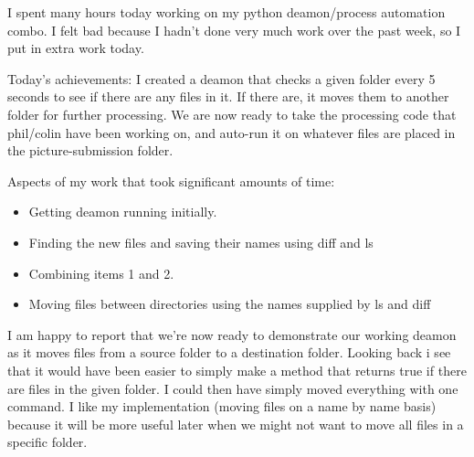 \documentclass[]{article}
\begin{document}
	I spent many hours today working on my python deamon/process automation combo. I felt bad because I hadn't done very much work over the past week, so I put in extra work today.
	
	Today's achievements: I created a deamon that checks a given folder every 5 seconds to see if there are any files in it. If there are, it moves them to another folder for further processing. We are now ready to take the processing code that phil/colin have been working on, and auto-run it on whatever files are placed in the picture-submission folder.
	
	Aspects of my work that took significant amounts of time:
	
	\begin{itemize}
					\item Getting deamon running initially.
					\item Finding the new files and saving their names using diff and ls
					\item Combining items 1 and 2.
					\item Moving files between directories using the names supplied by ls and diff
	\end{itemize}
		
	I am happy to report that we're now ready to demonstrate our working deamon as it moves files from a source folder to a destination folder.
	Looking back i see that it would have been easier to simply make a method that returns true if there are files in the given folder. I could then have simply moved everything with one command. I like my implementation (moving files on a name by name basis) because it will be more useful later when we might not want to move all files in a specific folder.	
	
\end{document}
